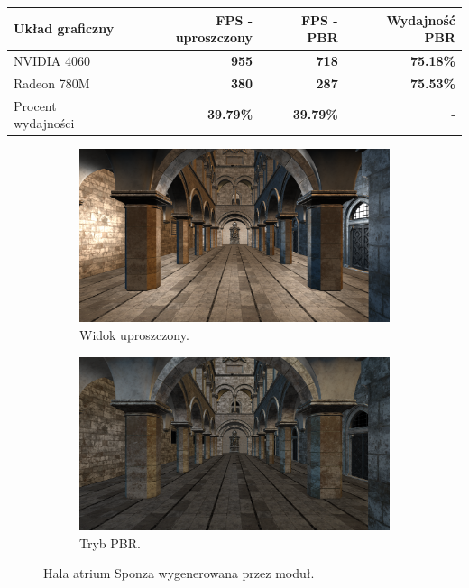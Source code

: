 \begin{center}
	\begin{tabular}{ |l r r r|}
		\hline
		\textbf{Układ graficzny} & \textbf{FPS - uproszczony} & \textbf{FPS - PBR} & \textbf{Wydajność PBR} \\
		\hline
		NVIDIA 4060 & \textbf{955} & \textbf{718} & \textbf{75.18\%} \\
		Radeon 780M & \textbf{380} & \textbf{287} & \textbf{75.53\%} \\
		Procent wydajności & \textbf{39.79\%} & \textbf{39.79\%} & - \\
		\hline
	\end{tabular}
\end{center}

	
\begin{figure}[h!]
	\begin{subfigure}{.5\textwidth}
		\centering
		\includegraphics[width=\textwidth]{images/demo_sponza_1.png}
		\caption{Widok uproszczony.}
	\end{subfigure}
	\begin{subfigure}{.5\textwidth}
		\centering
		\includegraphics[width=\textwidth]{images/demo_sponza_1_pbr.png}
		\caption{Tryb PBR.}
	\end{subfigure}
	\caption{Hala atrium Sponza wygenerowana przez moduł.}
	\label{test_sponza_1}
\end{figure}


